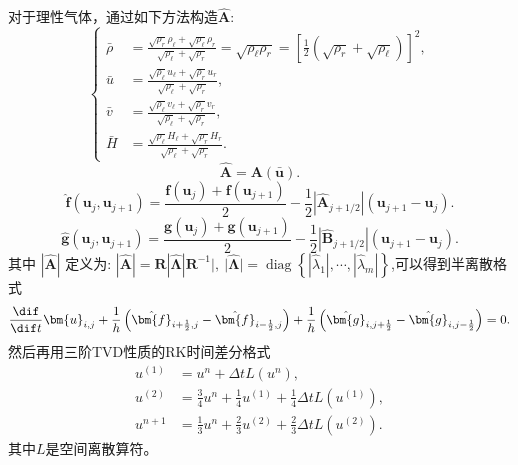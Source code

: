 \documentclass[12pt]{article}
\begin{document}
对于理性气体，通过如下方法构造$\hat{\bm{A}}$:
\begin{equation}
	\left\{
	\begin{aligned}
		\bar{\rho} & =\frac{\sqrt{\rho_{r}} \rho_{\ell}+\sqrt{\rho_{\ell}} \rho_{r}}{\sqrt{\rho_{\ell}}+\sqrt{\rho_{r}}}=\sqrt{\rho_{\ell} \rho_{r}}=\left[\frac{1}{2}\left(\sqrt{\rho_{r}} +\sqrt{\rho_{\ell}} \right)\right]^2, \\
		\bar{u}    & =\frac{\sqrt{\rho_{\ell}} u_{\ell}+\sqrt{\rho_{r}} u_{r}}{\sqrt{\rho_{\ell}}+\sqrt{\rho_{r}}},                                                                                                               \\
		\bar{v}    & =\frac{\sqrt{\rho_{\ell}} v_{\ell}+\sqrt{\rho_{r}} v_{r}}{\sqrt{\rho_{\ell}}+\sqrt{\rho_{r}}},                                                                                                               \\
		\bar{H}    & =\frac{\sqrt{\rho_{\ell}} H_{\ell}+\sqrt{\rho_{r}} H_{r}}{\sqrt{\rho_{\ell}}+\sqrt{\rho_{r}}}.
	\end{aligned}\right.
\end{equation}
\begin{equation}
	\hat{\bm{A}}=\bm{A}(\bm{\bar{u}}).
\end{equation}
\begin{equation}
	\hat{\bm{f}}\left(\bm{u}_{j}, \bm{u}_{j+1}\right)=\frac{\bm{f}\left(\bm{u}_{j}\right)+\bm{f}\left(\bm{u}_{j+1}\right)}{2}-\frac{1}{2}\left|\hat{\bm{A}}_{j+1 / 2}\right|\left(\bm{u}_{j+1}-\bm{u}_{j}\right).
\end{equation}
\begin{equation}
	\hat{\bm{g}}\left(\bm{u}_{j}, \bm{u}_{j+1}\right)=\frac{\bm{g}\left(\bm{u}_{j}\right)+\bm{g}\left(\bm{u}_{j+1}\right)}{2}-\frac{1}{2}\left|\hat{\bm{B}}_{j+1 / 2}\right|\left(\bm{u}_{j+1}-\bm{u}_{j}\right).
\end{equation}
其中 $|\hat{\bm{A}}|$ 定义为: $|\hat{\bm{A}}|=\bm{R}|\hat{\bm{\Lambda}}| \bm{R}^{-1}|,\ |\hat{\bm{\Lambda}} \mid=\operatorname{diag}\left\{\left|\hat{\lambda}_{1}\right|, \cdots,\left|\hat{\lambda}_{m}\right|\right\}$,可以得到半离散格式\cite[P294]{cfd}
\begin{equation}
	\frac{\dif}{\dif t}\bm{u}_{i,j} + \frac{1}{h}\left(\hat{\bm{f}}_{i+\frac{1}{2},j}-\hat{\bm{f}}_{i-\frac{1}{2},j}\right)+ \frac{1}{h}\left(\hat{\bm{g}}_{i,j+\frac{1}{2}}-\hat{\bm{g}}_{i,j-\frac{1}{2}}\right)=0.
\end{equation}
然后再用三阶TVD性质的RK时间差分格式
\begin{equation}
	\begin{aligned}
		{u}^{(1)} & ={u}^{n}+\Delta t L\left({u}^{n}\right)    ,                                             \\
		{u}^{(2)} & =\frac{3}{4} {u}^{n}+\frac{1}{4} {u}^{(1)}+\frac{1}{4} \Delta t L\left({u}^{(1)}\right), \\
		{u}^{n+1} & =\frac{1}{3} {u}^{n}+\frac{2}{3} {u}^{(2)}+\frac{2}{3} \Delta t L\left({u}^{(2)}\right).
	\end{aligned}
	\label{eq:11}
\end{equation}
其中$L$是空间离散算符。
\end{document}
